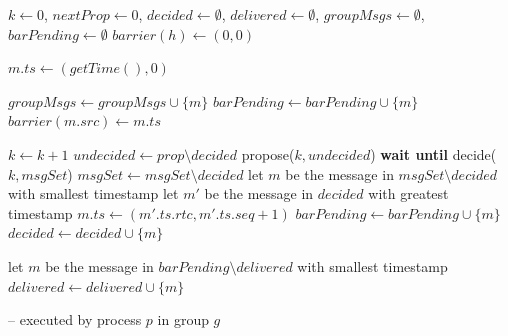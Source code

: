 \documentclass[times, 10pt]{article}
\begin{document}
\begin{algorithm}
\begin{distribalgo}[1]

\blankline
{}
  \STATE $k \leftarrow 0$, $nextProp \leftarrow 0$, $decided \leftarrow \emptyset$, $delivered \leftarrow \emptyset$, $groupMsgs \leftarrow \emptyset$, $barPending \leftarrow \emptyset$
    \STATE $barrier(h) \leftarrow (0,0)$ 
  \ENDINDENT
\ENDINDENT 

\blankline
{}
  \STATE $m.ts \leftarrow (getTime(),0)$
  \STATE {} \label{algline:rmlocal}
\ENDINDENT

\blankline
{}
    \STATE $groupMsgs \leftarrow groupMsgs \cup \{m\}$ \label{algline:addtogroupMsgs}
    \STATE $barPending \leftarrow barPending \cup \{m\}$ \label{algline:insbp1}
    \STATE $barrier(m.src) \leftarrow m.ts$ \label{algline:incbar}
  \ENDIF
\ENDWHEN

\blankline
{}
  \STATE $k \leftarrow k + 1$
	\STATE $undecided \leftarrow prop \setminus decided$
	\STATE propose($k, undecided$) \label{algline:propose}
	\STATE \textbf{wait until} decide($k, msgSet$)
  \STATE $msgSet \leftarrow msgSet \setminus decided$
		\STATE let $m$ be the message in $msgSet \setminus decided$ with smallest timestamp
		\STATE let $m'$ be the message in $decided$ with greatest timestamp
			\STATE $m.ts \leftarrow (m'.ts.rtc, m'.ts.seq + 1)$
		\ENDIF     
		 \label{algline:checkcons}
			\STATE $barPending \leftarrow barPending \cup \{m\}$  \label{algline:insbp2}
		\ENDIF
		\STATE $decided \leftarrow decided \cup \{m\}$  \label{algline:addtodecided}
		\STATE {} \label{algline:rmothers}
	\ENDWHILE

\ENDWHEN

\blankline
 \label{algline:inbarPending}
	\STATE let $m$ be the message in $barPending \setminus delivered$ with smallest timestamp
		  \STATE {} \label{algline:consdeliver}
		\ENDIF
		\STATE $delivered \leftarrow delivered \cup \{m\}$ \label{algline:addtodelivered}
	\ENDIF
\ENDWHEN
\blankline

\caption{ -- executed by process $p$ in group $g$}
\label{algorithm:deliveryminimal}
\end{distribalgo}
\end{algorithm}
\end{document}
